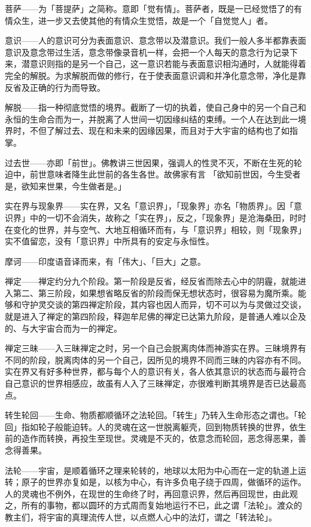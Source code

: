 \documentclass[twoside,openany]{book}
\begin{document}
\textbullet 菩萨——为「菩提萨」之简称。意即「觉有情」。菩萨者，既是一已经觉悟了的有情众生，进一步又去使其他的有情众生觉悟，故是一个「自觉觉人」者。

\textbullet 意识——人的意识可分为表面意识、意念带以及潜意识。我们一般人多半都靠表面意识及意念带过生活，意念带像录音机一样，会把一个人每天的意念行为记录下来，潜意识则指的是另一个自己，这一意识若能与表面意识相沟通时，人就能得着完全的解脱。为求解脱而做的修行，在于使表面意识调和并净化意念带，净化是靠反省及正确的行为而导致。

\textbullet 解脱——指一种彻底觉悟的境界。截断了一切的执着，使自己身中的另一个自己和永恒的生命合而为一，并脱离了人世间一切因缘纠结的束缚。一个人在达到此一境界时，不但了解过去、现在和未来的因缘因果，而且对于大宇宙的结构也了如指掌。

\textbullet 过去世——亦即「前世」。佛教讲三世因果，强调人的性灵不灭，不断在生死的轮迫中，前世意味者降生此世前的各生各世。故佛家有言	「欲知前世因，今生受者是，欲知来世果，今生做者是。」

\textbullet 实在界与现象界——实在界，又名「意识界」，「现象界」亦名「物质界」。因「意识界」中的一切不会消失，故称之「实在界」，反之，「现象界」是沧海桑田，时时在变化的世界，并与空气、大地互相循环而有，与「意识界」相较，则「现象界」实不值留恋，没有「意识界」中所具有的安定与永恒性。

\textbullet 摩诃——印度语音译而来，有「伟大」、「巨大」之意。

\textbullet 禅定——禅定约分九个阶段。第一阶段是反省，经反省而除去心中的阴霾，就能进入第二、第三阶段，如果想省略反省的阶段而保无想状态时，很容易为魔所乘。能够和守护灵交谈的第四禅定阶段，其内容也因人而异，切不可以为与灵做过交谈，就是进入了禅定的第四阶段，释迦牟尼佛的禅定已达第九阶段，是普通人难以企及的、与大宇宙合而为一的禅定。

\textbullet 禅定三昧——入三昧禅定之时，另一个自己会脱离肉体而神游实在界。三昧境界有不同的阶段，脱离肉体的另一个自己，因所见的境界不同而三昧的内容亦有不同。实在界又有好多种世界，都与每个人的意识有关，各人依其意识的状态而与最符合自己意识的世界相感应，故虽有人入了三昧禅定，亦很难判断其境界是否已达最高点。

\textbullet 转生轮回——生命、物质都顺循环之法轮回。「转生」乃转入生命形态之谓也。「轮回」指如轮子般能迫转。人的灵魂在这一世脱离躯壳，回到物质转换的世界，依生前的造作而转换，再投生至现世。灵魂是不灭的，依意念而轮回，恶念得恶果，善念得善果。

\iffalse
\textbullet 法轮——宇宙，是顺着循环之理来轮转的，地球以太阳为中心而在一定的轨道上运转；原子的世界亦复如是，以核为中心，有许多负电子绕于四周，做循环的运作。人的灵魂也不例外，在现世的生命终了时，再回意识界，然后再回现世，由此观之，所有的事物，都以圆环的方式周而复始地运行不已，此之谓「法轮」。渡众的教主们，将宇宙的真理流传人世，以点燃人心中的法灯，谓之「转法轮」。
\end{document}
